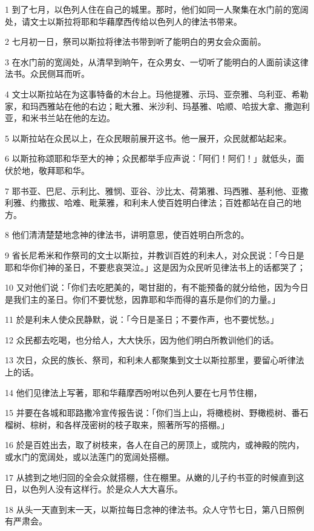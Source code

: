 \par 1 到了七月，以色列人住在自己的城里。那时，他们如同一人聚集在水门前的宽阔处，请文士以斯拉将耶和华藉摩西传给以色列人的律法书带来。
\par 2 七月初一日，祭司以斯拉将律法书带到听了能明白的男女会众面前。
\par 3 在水门前的宽阔处，从清早到晌午，在众男女、一切听了能明白的人面前读这律法书。众民侧耳而听。
\par 4 文士以斯拉站在为这事特备的木台上。玛他提雅、示玛、亚奈雅、乌利亚、希勒家，和玛西雅站在他的右边；毗大雅、米沙利、玛基雅、哈顺、哈拔大拿、撒迦利亚，和米书兰站在他的左边。
\par 5 以斯拉站在众民以上，在众民眼前展开这书。他一展开，众民就都站起来。
\par 6 以斯拉称颂耶和华至大的神；众民都举手应声说：「阿们！阿们！」就低头，面伏於地，敬拜耶和华。
\par 7 耶书亚、巴尼、示利比、雅悯、亚谷、沙比太、荷第雅、玛西雅、基利他、亚撒利雅、约撒拔、哈难、毗莱雅，和利未人使百姓明白律法；百姓都站在自己的地方。
\par 8 他们清清楚楚地念神的律法书，讲明意思，使百姓明白所念的。
\par 9 省长尼希米和作祭司的文士以斯拉，并教训百姓的利未人，对众民说：「今日是耶和华你们神的圣日，不要悲哀哭泣。」这是因为众民听见律法书上的话都哭了；
\par 10 又对他们说：「你们去吃肥美的，喝甘甜的，有不能预备的就分给他，因为今日是我们主的圣日。你们不要忧愁，因靠耶和华而得的喜乐是你们的力量。」
\par 11 於是利未人使众民静默，说：「今日是圣日；不要作声，也不要忧愁。」
\par 12 众民都去吃喝，也分给人，大大快乐，因为他们明白所教训他们的话。
\par 13 次日，众民的族长、祭司，和利未人都聚集到文士以斯拉那里，要留心听律法上的话。
\par 14 他们见律法上写著，耶和华藉摩西吩咐以色列人要在七月节住棚，
\par 15 并要在各城和耶路撒冷宣传报告说：「你们当上山，将橄榄树、野橄榄树、番石榴树、棕树，和各样茂密树的枝子取来，照著所写的搭棚。」
\par 16 於是百姓出去，取了树枝来，各人在自己的房顶上，或院内，或神殿的院内，或水门的宽阔处，或以法莲门的宽阔处搭棚。
\par 17 从掳到之地归回的全会众就搭棚，住在棚里。从嫩的儿子约书亚的时候直到这日，以色列人没有这样行。於是众人大大喜乐。
\par 18 从头一天直到末一天，以斯拉每日念神的律法书。众人守节七日，第八日照例有严肃会。

